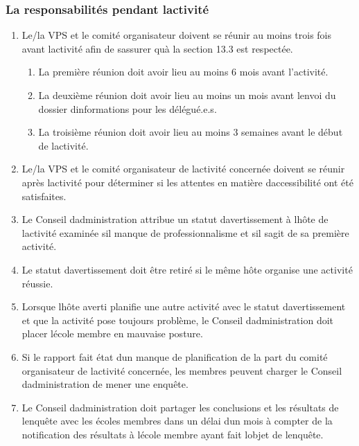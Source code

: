 \subsubsection{La responsabilités pendant l\textquotesingle activité}
\label{la-responsabilites-pendant-l-activite}

\begin{enumerate}
 \item
  Le/la VPS et le comité organisateur doivent se réunir au moins trois fois avant l\textquotesingle activité afin de s\textquotesingle assurer qu\textquotesingle à la section 13.3 est respectée.

  \begin{enumerate}
   \item
    La première réunion doit avoir lieu au moins 6 mois avant l'activité.
   \item
    La deuxième réunion doit avoir lieu au moins un mois avant l\textquotesingle envoi du dossier d\textquotesingle informations pour les délégué.e.s.
   \item
    La troisième réunion doit avoir lieu au moins 3 semaines avant le début de l\textquotesingle activité.
  \end{enumerate}
 \item
  Le/la VPS et le comité organisateur de l\textquotesingle activité concernée doivent se réunir après l\textquotesingle activité pour déterminer si les attentes en matière d\textquotesingle accessibilité ont été satisfaites.
 \item
  Le Conseil d\textquotesingle administration attribue un statut d\textquotesingle avertissement à l\textquotesingle hôte de l\textquotesingle activité examinée s\textquotesingle il manque de professionnalisme et s\textquotesingle il s\textquotesingle agit de sa première activité.
 \item
  Le statut d\textquotesingle avertissement doit être retiré si le même hôte organise une activité réussie.
 \item
  Lorsque l\textquotesingle hôte averti planifie une autre activité avec le statut d\textquotesingle avertissement et que la activité pose toujours problème, le Conseil d\textquotesingle administration doit placer l\textquotesingle école membre en mauvaise posture.
 \item
  Si le rapport fait état d\textquotesingle un manque de planification de la part du comité organisateur de l\textquotesingle activité concernée, les membres peuvent charger le Conseil d\textquotesingle administration de mener une enquête.
 \item
  Le Conseil d\textquotesingle administration doit partager les conclusions et les résultats de l\textquotesingle enquête avec les écoles membres dans un délai d\textquotesingle un mois à compter de la notification des résultats à l\textquotesingle école membre ayant fait l\textquotesingle objet de l\textquotesingle enquête.
\end{enumerate}

